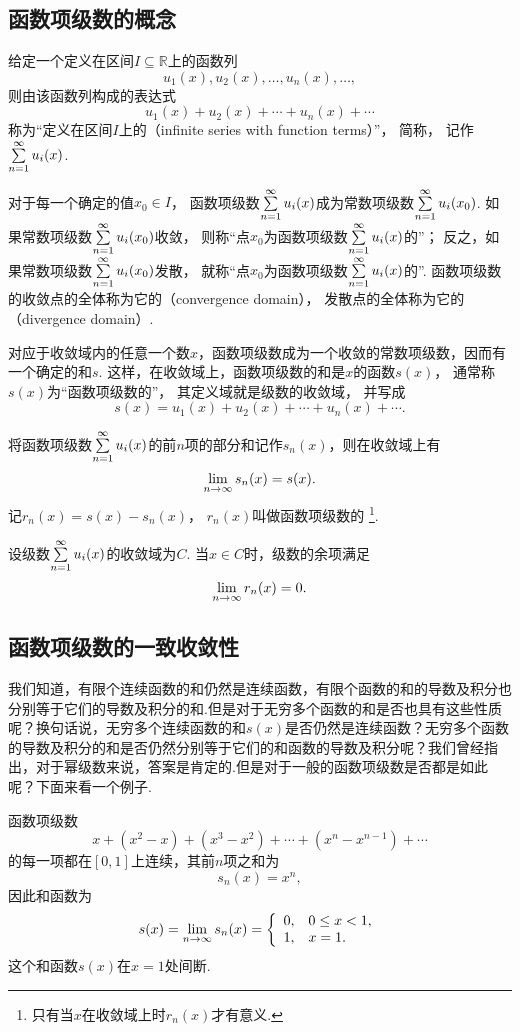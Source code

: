\subsection{函数项级数的概念}
\begin{definition}\label{definition:无穷级数.实函数项级数的概念}
给定一个定义在区间\(I \subseteq \mathbb{R}\)上的函数列\[
u_1(x),u_2(x),\dotsc,u_n(x),\dotsc,
\]
则由该函数列构成的表达式\[
u_1(x)+u_2(x)+\dotsb+u_n(x)+\dotsb
\]
称为“定义在区间\(I\)上的（infinite series with function terms）”，
简称，
记作\(\sum\limits_{n=1}^\infty u_i(x)\).

对于每一个确定的值\(x_0 \in I\)，
函数项级数\(\sum\limits_{n=1}^\infty u_i(x)\)成为常数项级数\(\sum\limits_{n=1}^\infty u_i(x_0)\).
如果常数项级数\(\sum\limits_{n=1}^\infty u_i(x_0)\)收敛，
则称“点\(x_0\)为函数项级数\(\sum\limits_{n=1}^\infty u_i(x)\)的”；
反之，如果常数项级数\(\sum\limits_{n=1}^\infty u_i(x_0)\)发散，
就称“点\(x_0\)为函数项级数\(\sum\limits_{n=1}^\infty u_i(x)\)的”.
函数项级数的收敛点的全体称为它的（convergence domain），
发散点的全体称为它的（divergence domain）.

对应于收敛域内的任意一个数\(x\)，函数项级数成为一个收敛的常数项级数，因而有一个确定的和\(s\).
这样，在收敛域上，函数项级数的和是\(x\)的函数\(s(x)\)，
通常称\(s(x)\)为“函数项级数的”，
其定义域就是级数的收敛域，
并写成\[
s(x) = u_1(x)+u_2(x)+\dotsb+u_n(x)+\dotsb.
\]

将函数项级数\(\sum\limits_{n=1}^\infty u_i(x)\)的前\(n\)项的部分和记作\(s_n(x)\)，则在收敛域上有\[
\lim\limits_{n\to\infty} s_n(x) = s(x).
\]
记\(r_n(x) = s(x)-s_n(x)\)，
\(r_n(x)\)叫做函数项级数的%
\footnote{只有当\(x\)在收敛域上时\(r_n(x)\)才有意义.}.
\end{definition}

\begin{property}
设级数\(\sum\limits_{n=1}^\infty u_i(x)\)的收敛域为\(C\).
当\(x \in C\)时，级数的余项满足\[
\lim\limits_{n\to\infty} r_n(x) = 0.
\]
\end{property}

\subsection{函数项级数的一致收敛性}
我们知道，有限个连续函数的和仍然是连续函数，有限个函数的和的导数及积分也分别等于它们的导数及积分的和.但是对于无穷多个函数的和是否也具有这些性质呢？换句话说，无穷多个连续函数的和\(s(x)\)是否仍然是连续函数？无穷多个函数的导数及积分的和是否仍然分别等于它们的和函数的导数及积分呢？我们曾经指出，对于幂级数来说，答案是肯定的.但是对于一般的函数项级数是否都是如此呢？下面来看一个例子.
\begin{example}
函数项级数\[
x + (x^2-x) + (x^3-x^2) + \dotsb + (x^n-x^{n-1}) + \dotsb
\]的每一项都在\([0,1]\)上连续，其前\(n\)项之和为\[
s_n(x) = x^n,
\]因此和函数为\[
s(x) = \lim\limits_{n\to\infty} s_n(x)
= \left\{ \begin{array}{ll}
0, & 0 \leq x < 1, \\
1, & x = 1.
\end{array} \right.
\]
这个和函数\(s(x)\)在\(x=1\)处间断.
\end{example}

